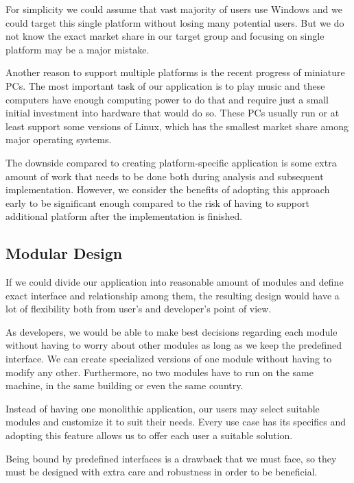 For simplicity we could assume that vast majority of users use Windows and we could target this single platform without losing many potential users. But we do not know the exact market share in our target group and focusing on single platform may be a major mistake.
\par
Another reason to support multiple platforms is the recent progress of miniature PCs. The most important task of our application is to play music and these computers have enough computing power to do that and require just a small initial investment into hardware that would do so. These PCs usually run or at least support some versions of Linux, which has the smallest market share among major operating systems.
\par
The downside compared to creating platform-specific application is some extra amount of work that needs to be done both during analysis and subsequent implementation. However, we consider the benefits of adopting this approach early to be significant enough compared to the risk of having to support additional platform after the implementation is finished.
\subsection{Modular Design}

If we could divide our application into reasonable amount of modules and define exact interface and relationship among them, the resulting design would have a lot of flexibility both from user's and developer's point of view.
\par
As developers, we would be able to make best decisions regarding each module without having to worry about other modules as long as we keep the predefined interface. We can create specialized versions of one module without having to modify any other. Furthermore, no two modules have to run on the same machine, in the same building or even the same country.
\par
Instead of having one monolithic application, our users may select suitable modules and customize it to suit their needs. Every use case has its specifics and adopting this feature allows us to offer each user a suitable solution.
\par
Being bound by predefined interfaces is a drawback that we must face, so they must be designed with extra care and robustness in order to be beneficial.

